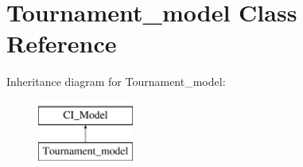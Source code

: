 \hypertarget{class_tournament__model}{}\section{Tournament\+\_\+model Class Reference}
\label{class_tournament__model}
Inheritance diagram for Tournament\+\_\+model\+:\begin{figure}[H]
\begin{center}
\leavevmode
\includegraphics[height=2.000000cm]{class_tournament__model}
\end{center}
\end{figure}
